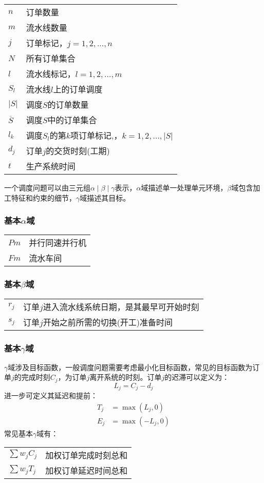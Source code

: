 \begin{supertabular}{ll}
$n$ & 订单数量\\
$m$ & 流水线数量\\
$j$ & 订单标记，$j = 1,2,...,n$\\
$N$ & 所有订单集合\\
$l$ & 流水线标记，$l = 1,2,...,m$\\
$S_l$ & 流水线$l$上的订单调度\\
$|S|$ & 调度$S$的订单数量\\
$\overline S$ & 调度$S$中的订单集合\\
$l_k$ & 调度$S_l$的第$k$项订单标记,，$k = 1,2,...,|S|$\\
$d_j$ & 订单$j$的交货时刻(工期)\\
$t$ & 生产系统时间\\[3pt]
\end{supertabular}

一个调度问题可以由三元组$\alpha \mid \beta \mid \gamma$表示，$\alpha$域描述单一处理单元环境，$\beta$域包含加工特征和约束的细节，$\gamma$域描述其目标\cite{pinedo}。

\subsubsection{基本$\alpha$域}
\begin{supertabular}{ll}
$Pm$ & 并行同速并行机\\
$Fm$ & 流水车间\\
\end{supertabular}

\subsubsection{基本$\beta$域}
\begin{supertabular}{ll}
$r_j$ & 订单$j$进入流水线系统日期，是其最早可开始时刻\\
$s_j$ & 订单$j$开始之前所需的切换(开工)准备时间\\
\end{supertabular}

\subsubsection{基本$\gamma$域}
$\gamma$域涉及目标函数，一般调度问题需要考虑最小化目标函数，常见的目标函数为订单$j$的完成时刻$C_j$，为订单$j$离开系统的时刻。订单$j$的迟滞可以定义为：
\[
L_j = C_j - d_j
\]
进一步可定义其延迟和提前：
\begin{align*}
T_j & = \max(L_j,0)\\
E_j & = \max(-L_j,0)
\end{align*}
常见基本$\gamma$域有：\\[3pt]
\begin{supertabular}{ll}
$\sum w_jC_j$ & 加权订单完成时刻总和 \\
$\sum w_jT_j$ & 加权订单延迟时间总和 \\
\end{supertabular}

